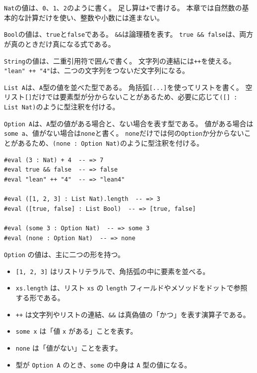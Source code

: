 \texttt{Nat}の値は、\texttt{0}、\texttt{1}、\texttt{2}のように書く。
足し算は\texttt{+}で書ける。
本章では自然数の基本的な計算だけを使い、整数や小数には進まない。

\texttt{Bool}の値は、\texttt{true}と\texttt{false}である。
\texttt{\&\&}は論理積を表す。
\texttt{true \&\& false}は、両方が真のときだけ真になる式である。

\texttt{String}の値は、二重引用符で囲んで書く。
文字列の連結には\texttt{++}を使える。
\texttt{"lean" ++ "4"}は、二つの文字列をつないだ文字列になる。

\texttt{List A}は、\texttt{A}型の値を並べた型である。
角括弧\texttt{[...]}を使ってリストを書く。
空リスト\texttt{[]}だけでは要素型が分からないことがあるため、必要に応じて\texttt{([] : List Nat)}のように型注釈を付ける。

\texttt{Option A}は、\texttt{A}型の値がある場合と、ない場合を表す型である。
値がある場合は\texttt{some a}、値がない場合は\texttt{none}と書く。
\texttt{none}だけでは何の\texttt{Option}か分からないことがあるため、\texttt{(none : Option Nat)}のように型注釈を付ける。

\begin{listing}[htbp]
\begin{verbatim}
#eval (3 : Nat) + 4  -- => 7
#eval true && false  -- => false
#eval "lean" ++ "4"  -- => "lean4"

#eval ([1, 2, 3] : List Nat).length  -- => 3
#eval ([true, false] : List Bool)  -- => [true, false]

#eval (some 3 : Option Nat)  -- => some 3
#eval (none : Option Nat)  -- => none
\end{verbatim}
\caption{基本型の値を評価する}
\label{lst:ch01-basic-values}
\end{listing}

\begin{syntaxbox}
\texttt{Option} の値は、主に二つの形を持つ。
\begin{itemize}
\item \texttt{[1, 2, 3]} はリストリテラルで、角括弧の中に要素を並べる。
\item \texttt{xs.length} は、リスト \texttt{xs} の \texttt{length} フィールドやメソッドをドットで参照する形である。
\item \texttt{++} は文字列やリストの連結、\texttt{\&\&} は真偽値の「かつ」を表す演算子である。
\item \texttt{some x} は「値 \texttt{x} がある」ことを表す。
\item \texttt{none} は「値がない」ことを表す。
\item 型が \texttt{Option A} のとき、\texttt{some} の中身は \texttt{A} 型の値になる。
\end{itemize}
\end{syntaxbox}


